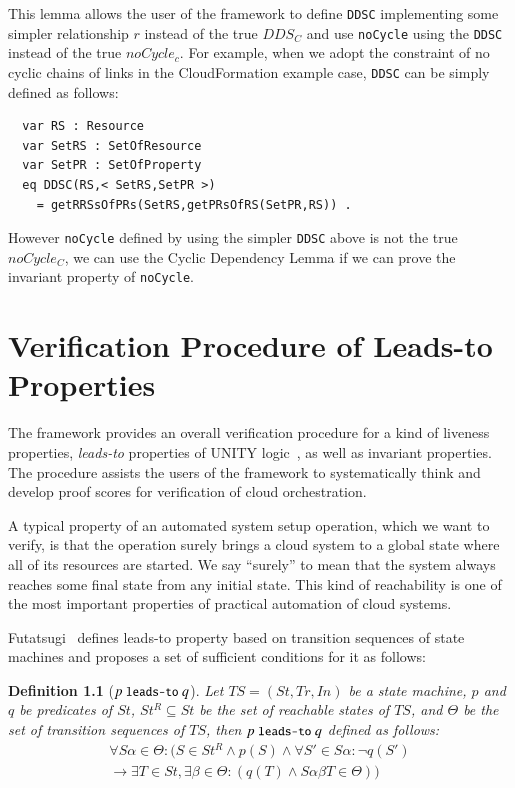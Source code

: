 \documentclass[12pt]{report}
\newtheorem{definition}{Definition}
\newcommand{\ra}{\rightarrow}
\newcommand{\mbstt}[1]{\mbox{\small{\tt {#1}}}}
\newcommand{\ul}{\underline}
\begin{document}
This lemma allows the user of the framework to define {\tt DDSC}
implementing some simpler relationship $r$ instead of the true $DDS_C$
and use {\tt noCycle} using the {\tt DDSC} instead of the true
$noCycle_c$. For example, when we adopt the constraint of no cyclic
chains of links in the CloudFormation example case, {\tt DDSC} can be
simply defined as follows:
\small
\begin{verbatim}
  var RS : Resource
  var SetRS : SetOfResource
  var SetPR : SetOfProperty
  eq DDSC(RS,< SetRS,SetPR >)
    = getRRSsOfPRs(SetRS,getPRsOfRS(SetPR,RS)) .
\end{verbatim}
\normalsize
However {\tt noCycle} defined by using the simpler {\tt DDSC} above is
 not the true $noCycle_C$, we can use the Cyclic Dependency Lemma if
 we can prove the invariant property of {\tt noCycle}.

\chapter{Verification Procedure of Leads-to Properties}
\label{chap:verification}
The framework provides an overall verification procedure for a kind of
liveness properties, {\it leads-to} properties of UNITY
logic~\cite{DBLP:books/daglib/0067338}, as well as invariant
properties.  The procedure assists the users of the framework to
systematically think and develop proof scores for verification of
cloud orchestration.

A typical property of an automated system setup operation, which we
want to verify, is that the operation surely brings a cloud system to
a global state where all of its resources are started.  We say ``surely''
to mean that the system always reaches some final state from any
initial state. This kind of reachability is one of the most important
properties of practical automation of cloud systems.

Futatsugi~\cite{Futatsugi15} defines leads-to property based on
transition sequences of state machines and proposes a set of
sufficient conditions for it as follows:
\begin{definition}[$p~\mbstt{leads-to}~q$]
\label{def:leadsto}
  Let $TS=(St,Tr,In)$ be a state machine, $p$ and $q$ be predicates of
  $St$, $St^R\subseteq St$ be the set of reachable states of $TS$, and
  $\Theta$ be the set of transition sequences of $TS$, then
  \ul{$p~\mbstt{leads-to}~q$} defined as follows:
  \begin{eqnarray*}
  \forall S\alpha\in \Theta: (S\in St^R \land p(S) \land
  \forall S'\in S\alpha: \neg q(S')\\
  \ra \exists T\in St, \exists\beta\in\Theta:(q(T) \land S\alpha\beta T\in \Theta))
  \end{eqnarray*}
\end{definition}
\end{document}
